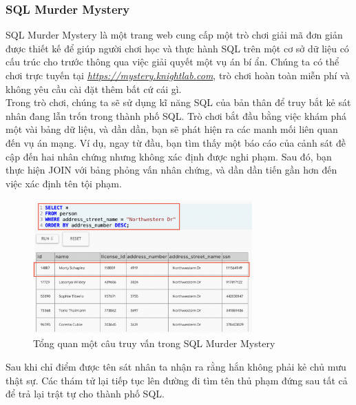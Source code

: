\subsubsection{SQL Murder Mystery}
\hspace*{0.5cm} SQL Murder Mystery là một trang web cung cấp một trò chơi giải mã đơn giản được thiết kế để giúp người chơi học và thực hành SQL trên một cơ sở dữ liệu có cấu trúc cho trước thông qua việc giải quyết một vụ án bí ẩn. Chúng ta có thể chơi trực tuyến tại \textit{\def\UrlFont{\bfseries}\url{https://mystery.knightlab.com}}, trò chơi hoàn toàn miễn phí và không yêu cầu cài đặt thêm bất cứ cái gì.\\
\hspace*{0.5cm} Trong trò chơi, chúng ta sẽ sử dụng kĩ năng SQL của bản thân để truy bắt kẻ sát nhân đang lẫn trốn trong thành phố SQL. Trò chơi bắt đầu bằng việc khám phá một vài bảng dữ liệu, và dần dần, bạn sẽ phát hiện ra các manh mối liên quan đến vụ án mạng. Ví dụ, ngay từ đầu, bạn tìm thấy một báo cáo của cảnh sát đề cập đến hai nhân chứng nhưng không xác định được nghi phạm. Sau đó, bạn thực hiện JOIN với bảng phỏng vấn nhân chứng, và dần dần tiến gần hơn đến việc xác định tên tội phạm.
\begin{figure}[H]
	\centering
	\includegraphics[width=0.75\textwidth]{Images/smm_play.png}
	\vspace{0.5cm}
	\caption{Tổng quan một câu truy vấn trong SQL Murder Mystery}
\end{figure}
\hspace*{0.5cm} Sau khi chỉ điểm được tên sát nhân ta nhận ra rằng hắn không phải kẻ chủ mưu thật sự. Các thám tử lại tiếp tục lên đường đi tìm tên thủ phạm đứng sau tất cả để trả lại trật tự cho thành phố SQL.

